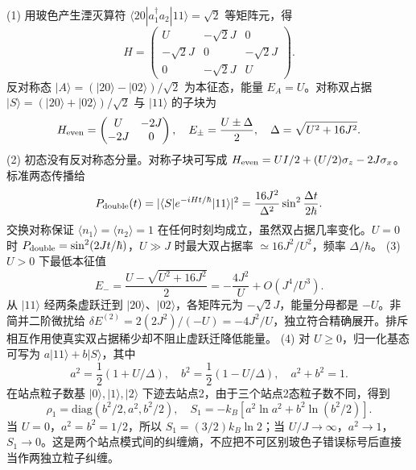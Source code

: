 (1) 用玻色产生湮灭算符 \(\langle20|a_1^\dagger a_2|11\rangle=\sqrt2\) 等矩阵元，得
\[
H=\begin{pmatrix}U&-\sqrt2J&0\\-\sqrt2J&0&-\sqrt2J\\0&-\sqrt2J&U\end{pmatrix}.
\]
反对称态 \(|A\rangle=(|20\rangle-|02\rangle)/\sqrt2\) 为本征态，能量 \(E_A=U\)。对称双占据 \(|S\rangle=(|20\rangle+|02\rangle)/\sqrt2\) 与 \(|11\rangle\) 的子块为
\[
H_{\rm even}=\begin{pmatrix}U&-2J\\-2J&0\end{pmatrix},
\quad E_\pm=\frac{U\pm\Delta}{2},\quad \Delta=\sqrt{U^2+16J^2}.
\]
(2) 初态没有反对称态分量。对称子块可写成 \(H_{\rm even}=UI/2+(U/2)\sigma_z-2J\sigma_x\)。标准两态传播给
\[
P_{\rm double}(t)=|\langle S|e^{-iHt/\hbar}|11\rangle|^2
=\frac{16J^2}{\Delta^2}\sin^2\frac{\Delta t}{2\hbar}.
\]
交换对称保证 \(\langle n_1\rangle=\langle n_2\rangle=1\) 在任何时刻均成立，虽然双占据几率变化。\(U=0\) 时 \(P_{\rm double}=\sin^2(2Jt/\hbar)\)，\(U\gg J\) 时最大双占据率 \(\simeq16J^2/U^2\)，频率 \(\Delta/\hbar\)。
(3) \(U>0\) 下最低本征值
\[
E_-=\frac{U-\sqrt{U^2+16J^2}}2=-\frac{4J^2}{U}+O(J^4/U^3).
\]
从 \(|11\rangle\) 经两条虚跃迁到 \(|20\rangle\)、\(|02\rangle\)，各矩阵元为 \(-\sqrt2J\)，能量分母都是 \(-U\)。非简并二阶微扰给 \(\delta E^{(2)}=2(2J^2)/(-U)=-4J^2/U\)，独立符合精确展开。排斥相互作用使真实双占据稀少却不阻止虚跃迁降低能量。
(4) 对 \(U\ge0\)，归一化基态可写为 \(a|11\rangle+b|S\rangle\)，其中
\[
a^2=\frac12(1+U/\Delta),\quad b^2=\frac12(1-U/\Delta),\quad a^2+b^2=1.
\]
在站点粒子数基 \(|0\rangle,|1\rangle,|2\rangle\) 下迹去站点2，由于三个站点2态粒子数不同，得到
\[
\rho_1=\mathrm{diag}(b^2/2,a^2,b^2/2),\quad
S_1=-k_B\left[a^2\ln a^2+b^2\ln(b^2/2)\right].
\]
当 \(U=0\)，\(a^2=b^2=1/2\)，所以 \(S_1=(3/2)k_B\ln2\)；当 \(U/J\to\infty\)，\(a^2\to1\)，\(S_1\to0\)。这是两个站点模式间的纠缠熵，不应把不可区别玻色子错误标号后直接当作两独立粒子纠缠。
